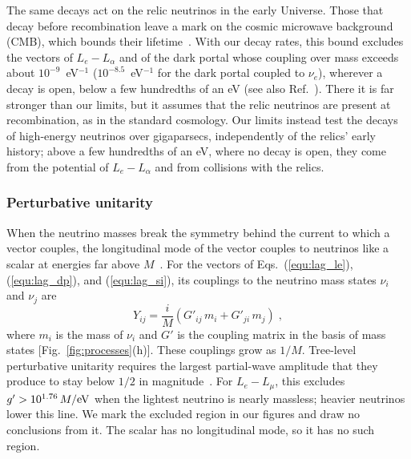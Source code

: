 \documentclass[linenumbers, aps, prd, twocolumn, superscriptaddress, floatfix, longbibliography, nofootinbib, bibnotes]{revtex4-2}
\begin{document}
The same decays act on the relic neutrinos in the early Universe.
Those that decay before recombination leave a mark on the cosmic microwave background (CMB), which bounds their lifetime~\cite{Escudero:2019gfk}.
With our decay rates, this bound excludes the vectors of $L_e - L_\alpha$ and of the dark portal whose coupling over mass exceeds about $10^{-9}$~eV$^{-1}$ ($10^{-8.5}$~eV$^{-1}$ for the dark portal coupled to $\nu_e$), wherever a decay is open, below a few hundredths of an eV (see also Ref.~\cite{Dror:2020fbh}).
There it is far stronger than our limits, but it assumes that the relic neutrinos are present at recombination, as in the standard cosmology.
Our limits instead test the decays of high-energy neutrinos over gigaparsecs, independently of the relics' early history; above a few hundredths of an eV, where no decay is open, they come from the potential of $L_e - L_\alpha$ and from collisions with the relics.

\subsubsection{Perturbative unitarity}
When the neutrino masses break the symmetry behind the current to which a vector couples, the longitudinal mode of the vector couples to neutrinos like a scalar at energies far above $M$~\cite{Dror:2020fbh}.
For the vectors of Eqs.~(\ref{equ:lag_le}), (\ref{equ:lag_dp}), and (\ref{equ:lag_si}), its couplings to the neutrino mass states $\nu_i$ and $\nu_j$ are
\begin{equation}
 \label{equ:goldstone}
 Y_{ij} = \frac{i}{M} \left( G'_{ij}\, m_i + G'_{ji}\, m_j \right) \;,
\end{equation}
where $m_i$ is the mass of $\nu_i$ and $G'$ is the coupling matrix in the basis of mass states [Fig.~\ref{fig:processes}(h)].
These couplings grow as $1/M$.
Tree-level perturbative unitarity requires the largest partial-wave amplitude that they produce to stay below $1/2$ in magnitude~\cite{Allwicher:2021rtd}.
For $L_e - L_\mu$, this excludes $g' > 10^{1.76}\, M/{\rm eV}$ when the lightest neutrino is nearly massless; heavier neutrinos lower this line.
We mark the excluded region in our figures and draw no conclusions from it.
The scalar has no longitudinal mode, so it has no such region.
\end{document}
